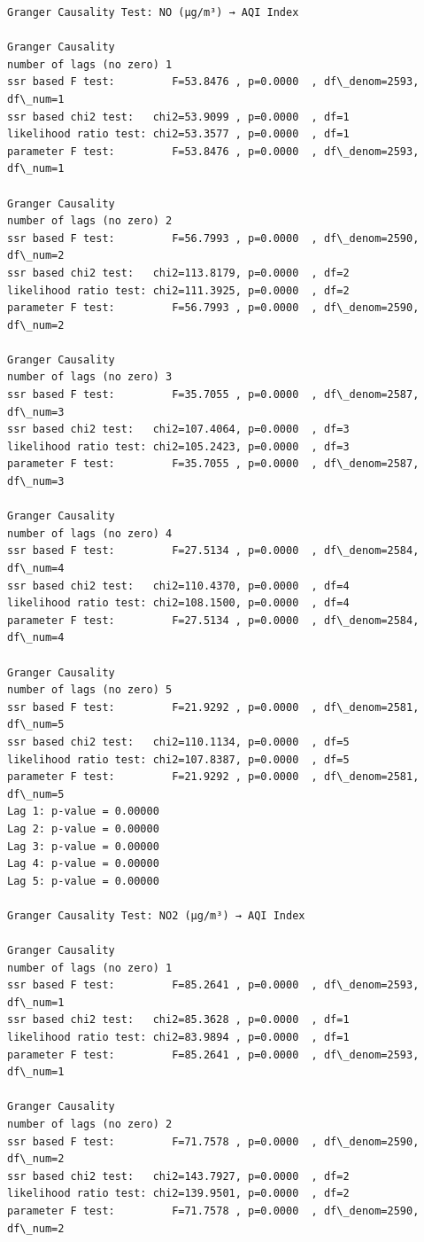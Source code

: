 \documentclass[11pt]{article}
\begin{document}
\begin{Verbatim}[commandchars=\\\{\}]
Granger Causality Test: NO (µg/m³) → AQI Index

Granger Causality
number of lags (no zero) 1
ssr based F test:         F=53.8476 , p=0.0000  , df\_denom=2593, df\_num=1
ssr based chi2 test:   chi2=53.9099 , p=0.0000  , df=1
likelihood ratio test: chi2=53.3577 , p=0.0000  , df=1
parameter F test:         F=53.8476 , p=0.0000  , df\_denom=2593, df\_num=1

Granger Causality
number of lags (no zero) 2
ssr based F test:         F=56.7993 , p=0.0000  , df\_denom=2590, df\_num=2
ssr based chi2 test:   chi2=113.8179, p=0.0000  , df=2
likelihood ratio test: chi2=111.3925, p=0.0000  , df=2
parameter F test:         F=56.7993 , p=0.0000  , df\_denom=2590, df\_num=2

Granger Causality
number of lags (no zero) 3
ssr based F test:         F=35.7055 , p=0.0000  , df\_denom=2587, df\_num=3
ssr based chi2 test:   chi2=107.4064, p=0.0000  , df=3
likelihood ratio test: chi2=105.2423, p=0.0000  , df=3
parameter F test:         F=35.7055 , p=0.0000  , df\_denom=2587, df\_num=3

Granger Causality
number of lags (no zero) 4
ssr based F test:         F=27.5134 , p=0.0000  , df\_denom=2584, df\_num=4
ssr based chi2 test:   chi2=110.4370, p=0.0000  , df=4
likelihood ratio test: chi2=108.1500, p=0.0000  , df=4
parameter F test:         F=27.5134 , p=0.0000  , df\_denom=2584, df\_num=4

Granger Causality
number of lags (no zero) 5
ssr based F test:         F=21.9292 , p=0.0000  , df\_denom=2581, df\_num=5
ssr based chi2 test:   chi2=110.1134, p=0.0000  , df=5
likelihood ratio test: chi2=107.8387, p=0.0000  , df=5
parameter F test:         F=21.9292 , p=0.0000  , df\_denom=2581, df\_num=5
Lag 1: p-value = 0.00000
Lag 2: p-value = 0.00000
Lag 3: p-value = 0.00000
Lag 4: p-value = 0.00000
Lag 5: p-value = 0.00000

Granger Causality Test: NO2 (µg/m³) → AQI Index

Granger Causality
number of lags (no zero) 1
ssr based F test:         F=85.2641 , p=0.0000  , df\_denom=2593, df\_num=1
ssr based chi2 test:   chi2=85.3628 , p=0.0000  , df=1
likelihood ratio test: chi2=83.9894 , p=0.0000  , df=1
parameter F test:         F=85.2641 , p=0.0000  , df\_denom=2593, df\_num=1

Granger Causality
number of lags (no zero) 2
ssr based F test:         F=71.7578 , p=0.0000  , df\_denom=2590, df\_num=2
ssr based chi2 test:   chi2=143.7927, p=0.0000  , df=2
likelihood ratio test: chi2=139.9501, p=0.0000  , df=2
parameter F test:         F=71.7578 , p=0.0000  , df\_denom=2590, df\_num=2


\end{Verbatim}
\end{document}
